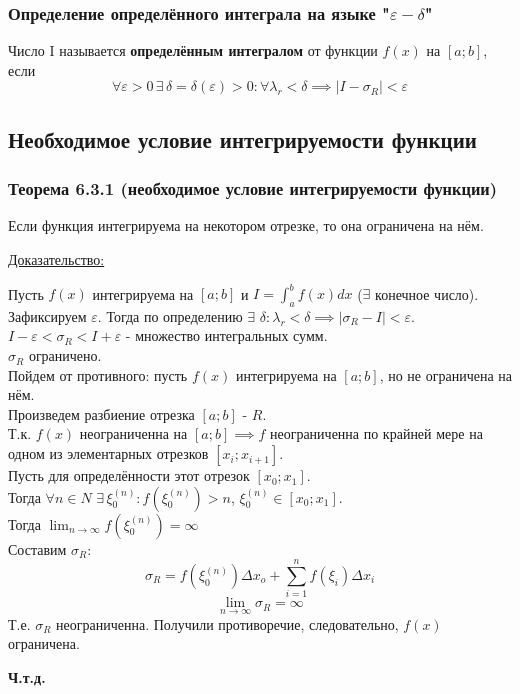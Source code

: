 \documentclass[12pt]{article}
\begin{document}
    \subsubsection*{Определение определённого интеграла на языке "$\varepsilon - \delta$"}\noindent
    Число I называется \textbf{определённым интегралом} от функции $f(x)$
    на $[a;b]$, если 
    \[\forall \varepsilon>0 \,\exists\, \delta = \delta(\varepsilon)>0: 
    \forall \lambda_r < \delta \implies |I-\sigma_R | <\varepsilon\]

    \subsection{Необходимое условие интегрируемости функции}
    \subsubsection*{Теорема 6.3.1 (необходимое условие интегрируемости функции)}\label{th:6.3.1}
    Если функция интегрируема на некотором отрезке, то она ограничена на нём.\par\noindent
    \underline{Доказательство:}
    \begin{adjustwidth}{1.5em}{1.5em}
        Пусть $f(x)$ интегрируема на $[a;b]$ и $I = \int_{a}^{b} f(x)dx$ ($\exists$ конечное число).\\
        Зафиксируем $\varepsilon$. Тогда по определению $\exists$ $\delta: \lambda_r < \delta \implies |\sigma_R - I| < \varepsilon$.\\
        $I-\varepsilon < \sigma_R < I+\varepsilon$ - множество интегральных сумм.\\
        $\sigma_R$ ограничено.\\
        Пойдем от противного: пусть $f(x)$ интегрируема на $[a;b]$, но не ограничена на нём.\\
        Произведем разбиение отрезка $[a;b]$ - $R$.\\
        Т.к. $f(x)$ неограниченна на $[a;b] \implies f$ неограниченна по крайней мере на одном из элементарных отрезков $[x_i;x_{i+1}]$.\\
        Пусть для определённости этот отрезок $[x_0;x_1]$.\\
        Тогда $\forall n \in N \,\,\exists \,\xi^{(n)}_0: f(\xi^{(n)}_0)>n$, $\xi^{(n)}_0 \in [x_0;x_1]$.\\
        Тогда $\lim_{n \to \infty} f(\xi^{(n)}_0) = \infty$\\
        Составим $\sigma_R$:
        \[ \sigma_R = f(\xi^{(n)}_0) \Delta x_o + \sum_{i=1}^{n} f(\xi_i) \Delta x_i \]
        \[ \lim_{n \to \infty} \sigma_R = \infty \]
        Т.е. $\sigma_R$ неограниченна. Получили противоречие, следовательно, $f(x)$ ограничена.
        \begin{center}
            \textbf{Ч.т.д.}
        \end{center}
    \end{adjustwidth}\noindent
\end{document}
